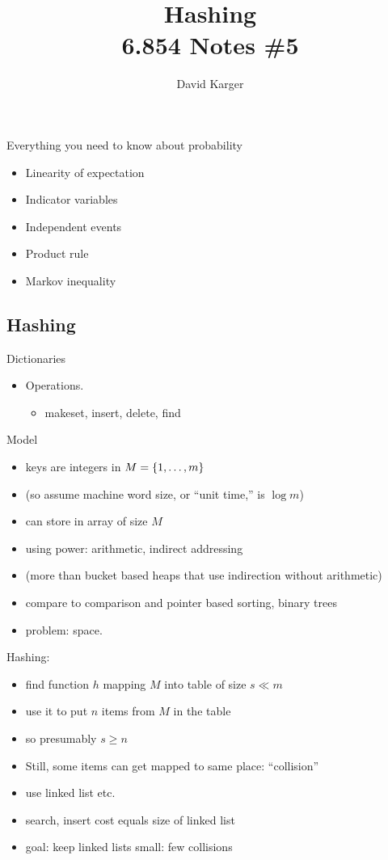 \documentclass[12pt]{article}
\title{Hashing\\ 6.854 Notes \#5}
\author{David Karger}
\begin{document}

Everything you need to know about probability
\begin{itemize}
\item Linearity of expectation
\item Indicator variables
\item Independent events
\item Product rule
\item Markov inequality
\end{itemize}

\subsection*{Hashing}

Dictionaries
\begin{itemize} 
   \item Operations.   
      \begin{itemize} 
      \item makeset, insert, delete, find
      \end{itemize}
\end{itemize}

Model
\begin{itemize}
\item keys are integers in $M=\{ 1,\ldots,m \}$ 
\item (so assume machine word size, or ``unit time,'' is $\log m$)
\item can store in array of size $M$
\item using power: arithmetic, indirect addressing
\item (more than bucket based heaps that use indirection without arithmetic)
\item compare to comparison and pointer based sorting, binary trees
\item problem: space.
\end{itemize}

Hashing:
\begin{itemize}
\item find function $h$ mapping $M$ into table of size $s \ll m$
\item use it to put $n$ items from $M$ in the table 
\item so presumably $s \ge n$
\item Still, some items can get mapped to same place: ``collision''
\item use linked list etc.
\item search, insert cost equals size of linked list
\item goal: keep linked lists small: few collisions
\end{itemize}
\end{document}
